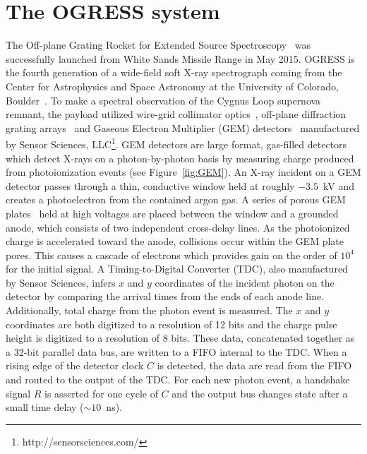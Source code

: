 \documentclass{ws-jai}
\begin{document}
\section{The OGRESS system}
\label{sect:ogress}
The Off-plane Grating Rocket for Extended Source Spectroscopy~\cite[OGRESS, NASA sounding rocket 36.292;][]{Rogers13}  was successfully launched from White Sands Missile Range in May 2015. OGRESS is the fourth generation of a wide-field soft X-ray spectrograph coming from the Center for Astrophysics and Space Astronomy at the University of Colorado, Boulder~\cite{McEntaffer08,Oakley09,Zeiger11}. To make a spectral observation of the Cygnus Loop supernova remnant, the payload utilized wire-grid collimator optics~\cite{Shipley11}, off-plane diffraction grating arrays~\cite{Cash1991,McEntaffer07} and Gaseous Electron Multiplier (GEM) detectors~\cite{Zeiger13} manufactured by Sensor Sciences, LLC\footnote{http://sensorsciences.com/}. GEM detectors are large format, gas-filled detectors which detect X-rays on a photon-by-photon basis by measuring charge produced from photoionization events (see Figure~\ref{fig:GEM}). An X-ray incident on a GEM detector passes through a thin, conductive window held at roughly $-3.5$~kV and creates a photoelectron from the contained argon gas. A series of porous GEM plates~\cite{Sauli97} held at high voltages are placed between the window and a grounded anode, which consists of two independent cross-delay lines. As the photoionized charge is accelerated toward the anode, collisions occur within the GEM plate pores. This causes a cascade of electrons which provides gain on the order of $10^4$ for the initial signal. A Timing-to-Digital Converter (TDC), also manufactured by Sensor Sciences, infers $x$ and $y$ coordinates of the incident photon on the detector by comparing the arrival times from the ends of each anode line. Additionally, total charge from the photon event is measured. The $x$ and $y$ coordinates are both digitized to a resolution of 12 bits and the charge pulse height is digitized to a resolution of 8 bits. These data, concatenated together as a 32-bit parallel data bus, are written to a FIFO internal to the TDC. When a rising edge of the detector clock $C$ is detected, the data are read from the FIFO and routed to the output of the TDC. For each new photon event, a handshake signal $R$ is asserted for one cycle of $C$ and the output bus changes state after a small time delay ($\sim 10$~ns). 
\end{document}
